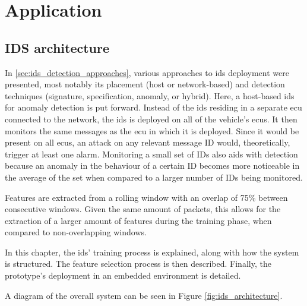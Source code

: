 \chapter{Application}

\section{IDS architecture}

In \ref{sec:ids_detection_approaches}, various approaches to \gls{ids} deployment were presented, most notably its placement (host or network-based) and detection techniques (signature, specification, anomaly, or hybrid). Here, a host-based \gls{ids} for anomaly detection is put forward. Instead of the \gls{ids} residing in a separate \gls{ecu} connected to the network, the \gls{ids} is deployed on all of the vehicle's \glspl{ecu}. It then monitors the same messages as the \gls{ecu} in which it is deployed. Since it would be present on all \glspl{ecu}, an attack on any relevant message ID would, theoretically, trigger at least one alarm. Monitoring a small set of IDs also aids with detection because an anomaly in the behaviour of a certain ID becomes more noticeable in the average of the set when compared to a larger number of IDs being monitored.\par
Features are extracted from a rolling window with an overlap of 75\% between consecutive windows. Given the same amount of packets, this allows for the extraction of a larger amount of features during the training phase, when compared to non-overlapping windows.\par
In this chapter, the \gls{ids}' training process is explained, along with how the system is structured. The feature selection process is then described. Finally, the prototype's deployment in an embedded environment is detailed.\par
A diagram of the overall system can be seen in Figure \ref{fig:ids_architecture}.

